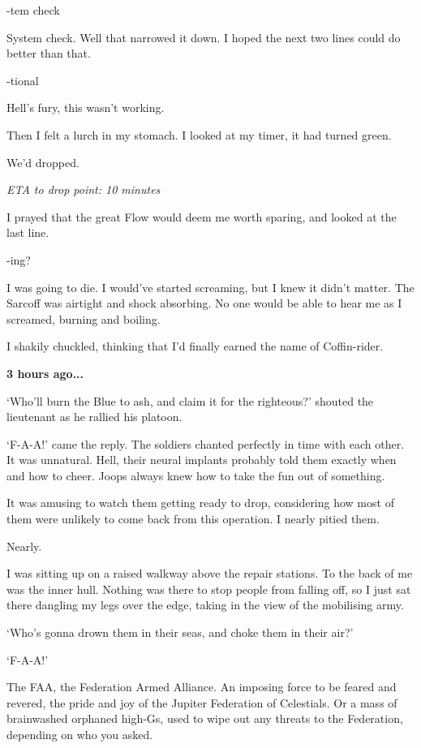 -tem check

System check. Well that narrowed it down. I hoped the next two lines could do better than that.

-tional

Hell's fury, this wasn't working.

Then I felt a lurch in my stomach. I looked at my timer, it had turned green. 

We'd dropped.

{\it ETA to drop point: 10 minutes}

I prayed that the great Flow would deem me worth sparing, and looked at the last line.

-ing?

I was going to die. I would've started screaming, but I knew it didn't matter. The Sarcoff was airtight and shock absorbing. No one would be able to hear me as I screamed, burning and boiling.

I shakily chuckled, thinking that I'd finally earned the name of Coffin-rider.

\vspace{5mm}

{\bf {\large 3 hours ago...}}

`Who'll burn the Blue to ash, and claim it for the righteous?' shouted the lieutenant as he rallied his platoon.

`F-A-A!' came the reply. The soldiers chanted perfectly in time with each other. It was unnatural. Hell, their neural implants probably told them exactly when and how to cheer. Joops always knew how to take the fun out of something.

It was amusing to watch them getting ready to drop, considering how most of them were unlikely to come back from this operation. I nearly pitied them.

Nearly.

I was sitting up on a raised walkway above the repair stations. To the back of me was the inner hull. Nothing was there to stop people from falling off, so I just sat there dangling my legs over the edge, taking in the view of the mobilising army.

`Who's gonna drown them in their seas, and choke them in their air?'

`F-A-A!'

The FAA, the Federation Armed Alliance. An imposing force to be feared and revered, the pride and joy of the Jupiter Federation of Celestials. Or a mass of brainwashed orphaned high-Gs, used to wipe out any threats to the Federation, depending on who you asked.

